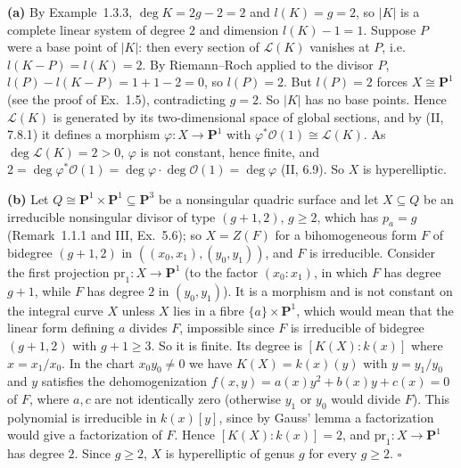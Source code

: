 \documentclass[11pt]{article}
\begin{document}
\pf
\textbf{(a)} By Example~1.3.3, $\deg K=2g-2=2$ and $l(K)=g=2$, so $|K|$ is a complete linear system of degree $2$ and dimension $l(K)-1=1$. Suppose $P$ were a base point of $|K|$: then every section of $\mathcal L(K)$ vanishes at $P$, i.e. $l(K-P)=l(K)=2$. By Riemann--Roch applied to the divisor $P$, $l(P)-l(K-P)=1+1-2=0$, so $l(P)=2$. But $l(P)=2$ forces $X\cong\mathbf P^1$ (see the proof of Ex.~1.5), contradicting $g=2$. So $|K|$ has no base points. Hence $\mathcal L(K)$ is generated by its two-dimensional space of global sections, and by (II, 7.8.1) it defines a morphism $\varphi:X\to\mathbf P^1$ with $\varphi^*\mathcal O(1)\cong\mathcal L(K)$. As $\deg\mathcal L(K)=2>0$, $\varphi$ is not constant, hence finite, and $2=\deg\varphi^*\mathcal O(1)=\deg\varphi\cdot\deg\mathcal O(1)=\deg\varphi$ (II, 6.9). So $X$ is hyperelliptic.

\textbf{(b)} Let $Q\cong\mathbf P^1\times\mathbf P^1\subseteq\mathbf P^3$ be a nonsingular quadric surface and let $X\subseteq Q$ be an irreducible nonsingular divisor of type $(g+1,2)$, $g\ge2$, which has $p_a=g$ (Remark~1.1.1 and III, Ex.~5.6); so $X=Z(F)$ for a bihomogeneous form $F$ of bidegree $(g+1,2)$ in $((x_0,x_1),(y_0,y_1))$, and $F$ is irreducible. Consider the first projection $\mathrm{pr}_1:X\to\mathbf P^1$ (to the factor $(x_0:x_1)$, in which $F$ has degree $g+1$, while $F$ has degree $2$ in $(y_0,y_1)$). It is a morphism and is not constant on the integral curve $X$ unless $X$ lies in a fibre $\{a\}\times\mathbf P^1$, which would mean that the linear form defining $a$ divides $F$, impossible since $F$ is irreducible of bidegree $(g+1,2)$ with $g+1\ge3$. So it is finite. Its degree is $[K(X):k(x)]$ where $x=x_1/x_0$. In the chart $x_0y_0\ne0$ we have $K(X)=k(x)(y)$ with $y=y_1/y_0$ and $y$ satisfies the dehomogenization $f(x,y)=a(x)y^2+b(x)y+c(x)=0$ of $F$, where $a,c$ are not identically zero (otherwise $y_1$ or $y_0$ would divide $F$). This polynomial is irreducible in $k(x)[y]$, since by Gauss' lemma a factorization would give a factorization of $F$. Hence $[K(X):k(x)]=2$, and $\mathrm{pr}_1:X\to\mathbf P^1$ has degree $2$. Since $g\ge2$, $X$ is hyperelliptic of genus $g$ for every $g\ge2$. \hfill$\square$
\end{document}
